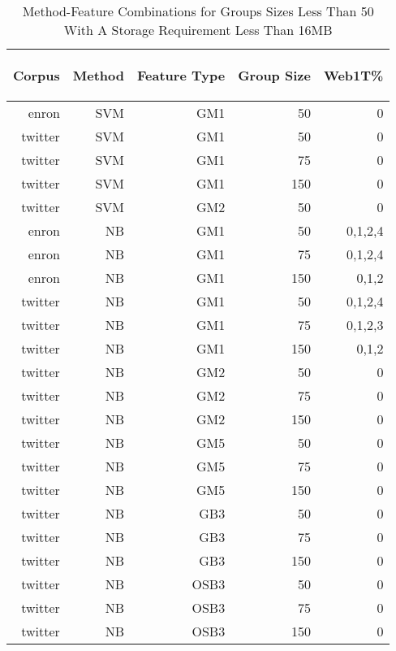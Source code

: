 	\begin{table}[!htbp]
	\begin{center}
		\begin{tabular}{|r|r|r|r|r|}
		\hline
		\begin{sideways}Corpus\end{sideways} & \begin{sideways}Method\end{sideways} & \begin{sideways}Feature Type\end{sideways} & \begin{sideways}Group Size\end{sideways} & \begin{sideways}Web1T\%\end{sideways}\\ \hline
		enron	& SVM	& GM1	& 50	& 0		\\ \hline
		twitter	& SVM	& GM1	& 50	& 0		\\ \hline
		twitter	& SVM	& GM1	& 75	& 0		\\ \hline
		twitter	& SVM	& GM1	& 150	& 0		\\ \hline
		twitter	& SVM	& GM2	& 50	& 0		\\ \hline
		enron	& NB	& GM1	& 50	& 0,1,2,4	\\ \hline
		enron	& NB	& GM1	& 75	& 0,1,2,4	\\ \hline
		enron	& NB	& GM1	& 150	& 0,1,2		\\ \hline
		twitter	& NB	& GM1	& 50	& 0,1,2,4	\\ \hline
		twitter	& NB	& GM1	& 75	& 0,1,2,3	\\ \hline
		twitter	& NB	& GM1	& 150	& 0,1,2		\\ \hline
		twitter	& NB	& GM2	& 50	& 0		\\ \hline
		twitter	& NB	& GM2	& 75	& 0		\\ \hline
		twitter	& NB	& GM2	& 150	& 0		\\ \hline
		twitter	& NB	& GM5	& 50	& 0		\\ \hline
		twitter	& NB	& GM5	& 75	& 0		\\ \hline
		twitter	& NB	& GM5	& 150	& 0		\\ \hline
		twitter	& NB	& GB3	& 50	& 0		\\ \hline
		twitter	& NB	& GB3	& 75	& 0		\\ \hline
		twitter	& NB	& GB3	& 150	& 0		\\ \hline
		twitter	& NB	& OSB3	& 50	& 0		\\ \hline
		twitter	& NB	& OSB3	& 75	& 0		\\ \hline
		twitter	& NB	& OSB3	& 150	& 0		\\ \hline
		\end{tabular}
		\caption{Method-Feature Combinations for Groups Sizes Less Than 50 With A Storage Requirement Less Than 16MB}
		\label{tab:method_feature_combos_over_gs_50_under_16MB}
	\end{center}
	\end{table}

